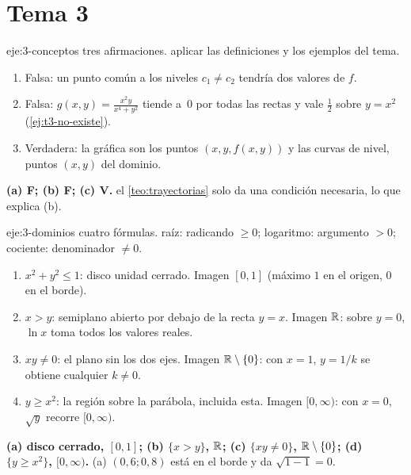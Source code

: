 \section{Tema 3}

\begin{solucion}{eje:3-conceptos}
\datos tres afirmaciones.
\planteamiento aplicar las definiciones y los ejemplos del tema.
\pasos
\begin{enumerate}[label=(\alph*)]
  \item Falsa: un punto común a los niveles $c_1\neq c_2$ tendría dos valores de $f$.
  \item Falsa: $g(x,y)=\frac{x^2y}{x^4+y^2}$ tiende a~0 por todas las rectas y vale $\frac12$ sobre $y=x^2$ (\cref{ej:t3-no-existe}).
  \item Verdadera: la gráfica son los puntos $(x,y,f(x,y))$ y las curvas de nivel, puntos $(x,y)$ del dominio.
\end{enumerate}
\resultado \textbf{(a) F; (b) F; (c) V.}
\comprobacion el \cref{teo:trayectorias} solo da una condición necesaria, lo que explica (b).
\end{solucion}

\begin{solucion}{eje:3-dominios}
\datos cuatro fórmulas.
\planteamiento raíz: radicando $\ge0$; logaritmo: argumento $>0$; cociente: denominador $\neq0$.
\pasos
\begin{enumerate}[label=(\alph*)]
  \item $x^2+y^2\le1$: disco unidad cerrado. Imagen $[0,1]$ (máximo $1$ en el origen, $0$ en el borde).
  \item $x>y$: semiplano abierto por debajo de la recta $y=x$. Imagen $\mathbb{R}$: sobre $y=0$, $\ln x$ toma todos los valores reales.
  \item $xy\neq0$: el plano sin los dos ejes. Imagen $\mathbb{R}\setminus\{0\}$: con $x=1$, $y=1/k$ se obtiene cualquier $k\neq0$.
  \item $y\ge x^2$: la región sobre la parábola, incluida esta. Imagen $[0,\infty)$: con $x=0$, $\sqrt y$ recorre $[0,\infty)$.
\end{enumerate}
\resultado \textbf{(a) disco cerrado, $[0,1]$; (b) $\{x>y\}$, $\mathbb{R}$; (c) $\{xy\neq0\}$, $\mathbb{R}\setminus\{0\}$; (d) $\{y\ge x^2\}$, $[0,\infty)$.}
\comprobacion (a) $(0{,}6;0{,}8)$ está en el borde y da $\sqrt{1-1}=0$.
\end{solucion}

